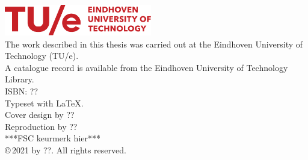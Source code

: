 \includegraphics[height=1.35cm]{TUe-logo-descriptor-line-tight}
\\[4mm]
{\small
The work described in this thesis was carried out at the Eindhoven University of Technology (TU/e).
\\[2mm]
A catalogue record is available from the Eindhoven University of Technology Library.\\
ISBN: ??
\\[3mm]
Typeset with \LaTeX.
\\
Cover design by ??
\\
Reproduction by ??
\\[2mm]
\vspace{0.64854cm}
***FSC keurmerk hier***
\\[2mm]
\copyright\,2021 by ??. All rights reserved.}


